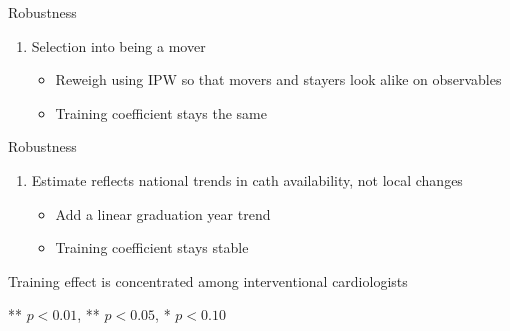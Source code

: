 \documentclass[10pt,aspectratio=169]{beamer}
\begin{document}
\begin{frame}{Robustness}
    \centering{
    }

    \vspace{5mm}
    \begin{enumerate}
        \item Selection into being a mover
            \begin{itemize}
                \item Reweigh using IPW so that movers and stayers look alike on observables
                \item[$\rightarrow$] Training coefficient stays the same
            \end{itemize}
    \end{enumerate}
\end{frame}

\begin{frame}{Robustness}
    \centering{
    }

    \vspace{5mm}
    \begin{enumerate}
        \item[2.] Estimate reflects national trends in cath availability, not local changes 
            \begin{itemize}
                \item Add a linear graduation year trend
                \item[$\rightarrow$] Training coefficient stays stable
            \end{itemize}
    \end{enumerate}
\end{frame}

\begin{frame}{Training effect is concentrated among interventional cardiologists}
    \centering
    \begin{threeparttable}
    
    \begin{tablenotes}[flushleft]
        \footnotesize
        \item *** $p < 0.01$, ** $p < 0.05$, * $p < 0.10$
    \end{tablenotes}
    \end{threeparttable}
\end{frame}
\end{document}
